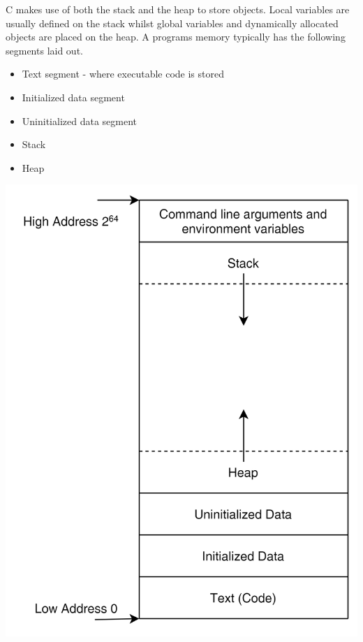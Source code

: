 \begin{multicols}{2}
    C makes use of both the stack and the heap to store objects. Local variables are usually defined on the stack whilst global variables and dynamically allocated objects are placed on the heap. A programs memory typically has the following segments laid out.

    \begin{itemize}
    \item Text segment - where executable code is stored
    \item Initialized data segment
    \item Uninitialized data segment
    \item Stack
    \item Heap
\end{itemize}

\begin{center}
    \includegraphics[height=0.4\textheight]{stack.png}
\end{center}
\end{multicols}

